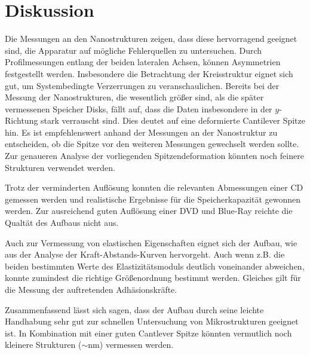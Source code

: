 \newpage
\section{Diskussion}
Die Messungen an den Nanostrukturen zeigen, dass diese hervorragend geeignet sind, die Apparatur auf
mögliche Fehlerquellen zu untersuchen. Durch Profilmessungen entlang der beiden lateralen Achsen,
können Asymmetrien festgestellt werden. Insbesondere die Betrachtung der Kreisstruktur eignet sich
gut, um Systembedingte Verzerrungen zu veranschaulichen. Bereits bei der Messung der Nanostrukturen,
die wesentlich größer sind, als die später vermessenen Speicher Disks, fällt auf, dass die
Daten insbesondere in der $y$-Richtung stark verrauscht sind. Dies deutet auf eine deformierte
Cantilever Spitze hin. Es ist empfehlenswert anhand der Messungen an der Nanostruktur zu entscheiden,
ob die Spitze vor den weiteren Messungen gewechselt werden sollte. Zur genaueren Analyse der vorliegenden
Spitzendeformation könnten noch feinere Strukturen verwendet werden.

Trotz der verminderten Auflösung konnten die relevanten Abmessungen einer CD gemessen werden und realistische
Ergebnisse für die Speicherkapazität gewonnen werden. Zur ausreichend guten Auflösung einer
DVD und Blue-Ray reichte die Qualtät des Aufbaus nicht aus.

Auch zur Vermessung von elastischen Eigenschaften eignet sich der Aufbau, wie aus der Analyse der
Kraft-Abstands-Kurven hervorgeht. Auch wenn z.B. die beiden bestimmten Werte des Elastizitätsmoduls
deutlich voneinander abweichen, konnte zumindest die richtige Größenordnung bestimmt werden. Gleiches gilt
für die Messung der auftretenden Adhäsionskräfte.

Zusammenfassend lässt sich sagen, dass der Aufbau durch seine leichte Handhabung sehr gut zur schnellen
Untersuchung von Mikrostrukturen geeignet ist. In Kombination
mit einer guten Cantlever Spitze könnten vermutlich noch kleinere Strukturen ($\sim \si{\nano\meter}$) vermessen werden.
